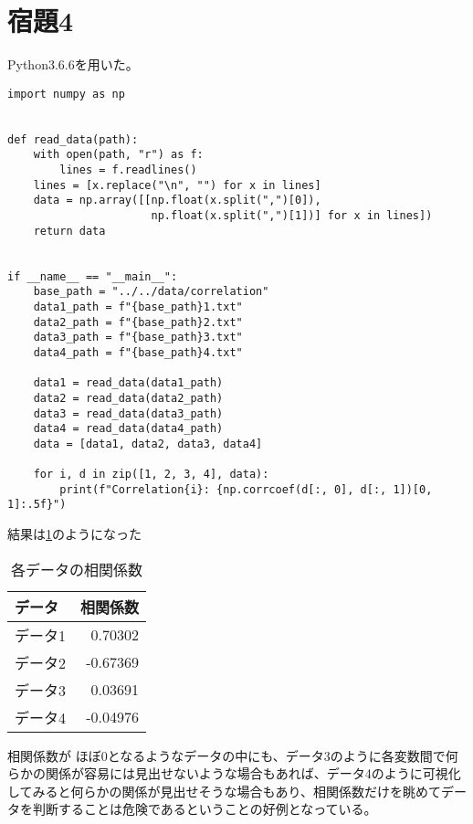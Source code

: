 \documentclass[10pt,a4paper]{ltjsarticle}       %
\begin{document}
\section{宿題4}
Python3.6.6を用いた。
\begin{lstlisting}
import numpy as np


def read_data(path):
    with open(path, "r") as f:
        lines = f.readlines()
    lines = [x.replace("\n", "") for x in lines]
    data = np.array([[np.float(x.split(",")[0]),
                      np.float(x.split(",")[1])] for x in lines])
    return data


if __name__ == "__main__":
    base_path = "../../data/correlation"
    data1_path = f"{base_path}1.txt"
    data2_path = f"{base_path}2.txt"
    data3_path = f"{base_path}3.txt"
    data4_path = f"{base_path}4.txt"

    data1 = read_data(data1_path)
    data2 = read_data(data2_path)
    data3 = read_data(data3_path)
    data4 = read_data(data4_path)
    data = [data1, data2, data3, data4]

    for i, d in zip([1, 2, 3, 4], data):
        print(f"Correlation{i}: {np.corrcoef(d[:, 0], d[:, 1])[0, 1]:.5f}")
\end{lstlisting}
結果は\ref{tab:correlation}のようになった
\begin{table}[h]
\begin{center}
\begin{tabular}{|l | r|} \hline
  データ & 相関係数 \\ \hline
  データ1 & 0.70302 \\ \hline
  データ2 & -0.67369 \\ \hline
  データ3 & 0.03691 \\ \hline
  データ4 & -0.04976 \\ \hline
\end{tabular}
\caption{各データの相関係数}
\label{tab:correlation}
\end{center}
\end{table}
相関係数が ほぼ0となるようなデータの中にも、データ3のように各変数間で何らかの関係が容易には見出せないような場合もあれば、データ4のように可視化してみると何らかの関係が見出せそうな場合もあり、相関係数だけを眺めてデータを判断することは危険であるということの好例となっている。



\end{document}
